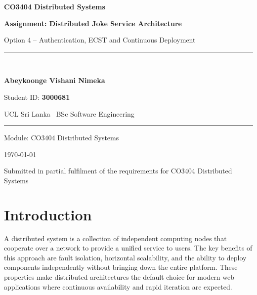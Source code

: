 \documentclass[12pt,a4paper]{article}
\begin{document}
\begin{titlepage}
  \thispagestyle{empty}
  \centering
  \vspace*{1.8cm}

  {\LARGE\bfseries CO3404 Distributed Systems\par}
  \vspace{0.4cm}
  {\large\bfseries Assignment: Distributed Joke Service Architecture\par}
  \vspace{0.3cm}
  {\normalsize Option 4 -- Authentication, ECST and Continuous Deployment\par}

  \vspace{2.2cm}
  \rule{0.75\linewidth}{0.6pt}\\[0.5cm]

  {\Large\bfseries Abeykoonge Vishani Nimeka\par}
  \vspace{0.25cm}
  {\normalsize Student ID: \textbf{3000681}\par}
  \vspace{0.15cm}
  {\normalsize UCL Sri Lanka \textbar\ BSc Software Engineering\par}

  \vspace{0.5cm}
  \rule{0.75\linewidth}{0.6pt}

  \vspace{1.2cm}
  {\normalsize Module: CO3404 Distributed Systems\par}
  \vspace{0.2cm}
  {\normalsize \today\par}

  \vfill
  {\small Submitted in partial fulfilment of the requirements for CO3404 Distributed Systems}
\end{titlepage}

\newpage
\thispagestyle{empty}
\tableofcontents
\newpage

\section{Introduction}

A distributed system is a collection of independent computing nodes that cooperate over a network to provide a unified service to users. The key benefits of this approach are fault isolation, horizontal scalability, and the ability to deploy components independently without bringing down the entire platform. These properties make distributed architectures the default choice for modern web applications where continuous availability and rapid iteration are expected.
\end{document}
